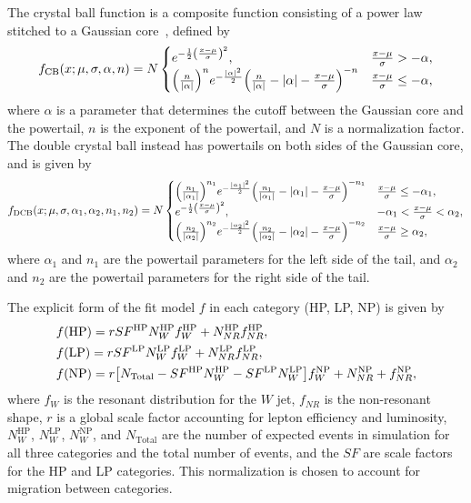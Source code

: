 The crystal ball function is a composite function consisting of a power law stitched to a Gaussian core~\cite{Cheng_2016}, defined by
\begin{equation}
  f_\mathrm{CB}(x;\mu,\sigma,\alpha,n)=N
  \begin{cases}
    e^{-\frac{1}{2}\pqty{\frac{x-\mu}{\sigma}}^2}, & \frac{x-\mu}{\sigma}>-\alpha,\\
    \pqty{\frac{n}{|\alpha|}}^ne^{-\frac{|\alpha|^2}{2}}\pqty{\frac{n}{|\alpha|}-|\alpha|-\frac{x-\mu}{\sigma}}^{-n} & \frac{x-\mu}{\sigma}\leq-\alpha,
  \end{cases}
\end{equation}
where $\alpha$ is a parameter that determines the cutoff between the Gaussian core and the powertail, $n$ is the exponent of the powertail, and $N$ is a normalization factor.
The double crystal ball instead has powertails on both sides of the Gaussian core, and is given by
\begin{equation}
  f_\mathrm{DCB}(x;\mu,\sigma,\alpha_1,\alpha_2,n_1,n_2)=N
  \begin{cases}
    \pqty{\frac{n_1}{|\alpha_1|}}^{n_1}e^{-\frac{|\alpha_1|^2}{2}}\pqty{\frac{n_1}{|\alpha_1|}-|\alpha_1|-\frac{x-\mu}{\sigma}}^{-n_1} & \frac{x-\mu}{\sigma}\leq-\alpha_1,\\
    e^{-\frac{1}{2}\pqty{\frac{x-\mu}{\sigma}}^2}, & -\alpha_1<\frac{x-\mu}{\sigma}<\alpha_2,\\
    \pqty{\frac{n_2}{|\alpha_2|}}^{n_2}e^{-\frac{|\alpha_2|^2}{2}}\pqty{\frac{n_2}{|\alpha_2|}-|\alpha_2|-\frac{x-\mu}{\sigma}}^{-n_2} & \frac{x-\mu}{\sigma}\geq\alpha_2,
  \end{cases}
\end{equation}
where $\alpha_1$ and $n_1$ are the powertail parameters for the left side of the tail, and $\alpha_2$ and $n_2$ are the powertail parameters for the right side of the tail.

The explicit form of the fit model $f$ in each category (HP, LP, NP) is given by
\begin{align}
  & f(\mathrm{HP})=rSF^\mathrm{HP}N_W^\mathrm{HP}f_W^\mathrm{HP}+N_{NR}^\mathrm{HP}f_{NR}^\mathrm{HP},\label{eq:VtagFit1}\\
  & f(\mathrm{LP})=rSF^\mathrm{LP}N_W^\mathrm{LP}f_W^\mathrm{LP}+N_{NR}^\mathrm{LP}f_{NR}^\mathrm{LP},\label{eq:VtagFit2}\\
  & f(\mathrm{NP})=r\bqty{N_\mathrm{Total}-SF^\mathrm{HP}N_W^\mathrm{HP}-SF^\mathrm{LP}N_W^\mathrm{LP}}f_W^\mathrm{NP}+N_{NR}^\mathrm{NP}+f_{NR}^\mathrm{NP},\label{eq:VtagFit3}
\end{align}
where $f_W$ is the resonant distribution for the $W$ jet, $f_{NR}$ is the non-resonant shape, $r$ is a global scale factor accounting for lepton efficiency and luminosity, $N_{W}^\mathrm{HP}$, $N_{W}^\mathrm{LP}$, $N_{W}^\mathrm{NP}$, and $N_\mathrm{Total}$ are the number of expected events in simulation for all three categories and the total number of events, and the $SF$ are scale factors for the HP and LP categories.
This normalization is chosen to account for migration between categories.

